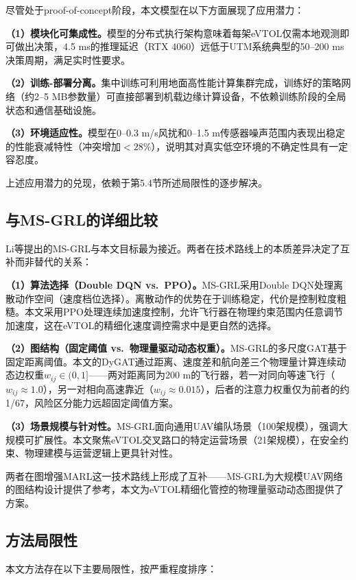 \documentclass[12pt,a4paper,UTF8]{ctexart}
\begin{document}
尽管处于proof-of-concept阶段，本文模型在以下方面展现了应用潜力：

\textbf{（1）模块化可集成性。}模型的分布式执行架构意味着每架eVTOL仅需本地观测即可做出决策，4.5 ms的推理延迟（RTX 4060）远低于UTM系统典型的50--200 ms决策周期，满足实时性要求。

\textbf{（2）训练-部署分离。}集中训练可利用地面高性能计算集群完成，训练好的策略网络（约2--5 MB参数量）可直接部署到机载边缘计算设备，不依赖训练阶段的全局状态和通信基础设施。

\textbf{（3）环境适应性。}模型在0--0.3 m/s风扰和0--1.5 m传感器噪声范围内表现出稳定的性能衰减特性（冲突增加$<28\%$），说明其对真实低空环境的不确定性具有一定容忍度。

上述应用潜力的兑现，依赖于第5.4节所述局限性的逐步解决。

\subsection{与MS-GRL的详细比较}

Li等提出的MS-GRL\cite{ref24}与本文目标最为接近。两者在技术路线上的本质差异决定了互补而非替代的关系：

\textbf{（1）算法选择（Double DQN vs.\ PPO）。}MS-GRL采用Double DQN处理离散动作空间（速度档位选择）。离散动作的优势在于训练稳定，代价是控制粒度粗糙。本文采用PPO处理连续加速度控制，允许飞行器在物理约束范围内任意调节加速度，这在eVTOL的精细化速度调控需求中是更自然的选择。

\textbf{（2）图结构（固定阈值 vs.\ 物理量驱动动态权重）。}MS-GRL的多尺度GAT基于固定距离阈值。本文的DyGAT通过距离、速度差和航向差三个物理量计算连续动态边权重$w_{ij} \in (0, 1]$——两对距离同为200 m的飞行器，若一对同向等速飞行（$w_{ij} \approx 1.0$），另一对相向高速靠近（$w_{ij} \approx 0.015$），后者的注意力权重仅为前者的约1/67，风险区分能力远超固定阈值方案。

\textbf{（3）场景规模与针对性。}MS-GRL面向通用UAV编队场景（100架规模），强调大规模可扩展性。本文聚焦eVTOL交叉路口的特定运营场景（21架规模），在安全约束、物理建模与运营逻辑上更具针对性。

两者在图增强MARL这一技术路线上形成了互补——MS-GRL为大规模UAV网络的图结构设计提供了参考，本文为eVTOL精细化管控的物理量驱动动态图提供了方案。

\subsection{方法局限性}

本文方法存在以下主要局限性，按严重程度排序：
\end{document}
